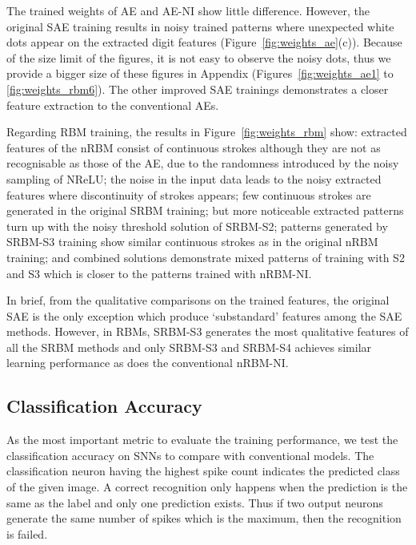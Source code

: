 The trained weights of AE and AE-NI show little difference.
However, the original SAE training results in noisy trained patterns where unexpected white dots appear on the extracted digit features (Figure~\ref{fig:weights_ae}(c)).
Because of the size limit of the figures, it is not easy to observe the noisy dots, thus we provide a bigger size of these figures in Appendix (Figures~\ref{fig:weights_ae1} to \ref{fig:weights_rbm6}).
The other improved SAE trainings demonstrates a closer feature extraction to the conventional AEs.



Regarding RBM training,
the results in Figure~\ref{fig:weights_rbm} show:
extracted features of the nRBM consist of continuous strokes although they are not as recognisable as those of the AE, due to the randomness introduced by the noisy sampling of NReLU;
the noise in the input data leads to the noisy extracted features where discontinuity of strokes appears;
few continuous strokes are generated in the original SRBM training;
but more noticeable extracted patterns turn up with the noisy threshold solution of SRBM-S2;
patterns generated by SRBM-S3 training show similar continuous strokes as in the original nRBM training;
and combined solutions demonstrate mixed patterns of training with S2 and S3 which is closer to the patterns trained with nRBM-NI. 

In brief, from the qualitative comparisons on the trained features, the original SAE is the only exception which produce `substandard' features among the SAE methods.
However, in RBMs, SRBM-S3 generates the most qualitative features of all the SRBM methods and only SRBM-S3 and SRBM-S4 achieves similar learning performance as does the conventional nRBM-NI.
\subsection{Classification Accuracy}
\label{subsec:MNIST_ca}
As the most important metric to evaluate the training performance, we test the classification accuracy on SNNs to compare with conventional models.
The classification neuron having the highest spike count indicates the predicted class of the given image.
A correct recognition only happens when the prediction is the same as the label and only one prediction exists.
Thus if two output neurons generate the same number of spikes which is the maximum, then the recognition is failed.

